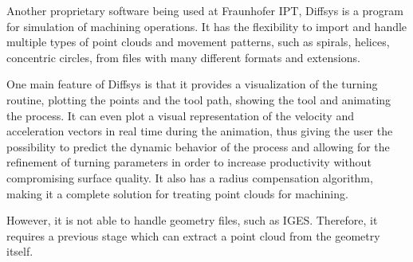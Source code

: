 	Another proprietary software being used at Fraunhofer IPT, Diffsys is a program for simulation of machining operations. It has the flexibility to import and handle multiple types of point clouds and movement patterns, such as spirals, helices, concentric circles, from files with many different formats and extensions.
	
	One main feature of Diffsys is that it provides a visualization of the turning routine, plotting the points and the tool path, showing the tool and animating the process. It can even plot a visual representation of the velocity and acceleration vectors in real time during the animation, thus giving the user the possibility to predict the dynamic behavior of the process and allowing for the refinement of turning parameters in order to increase productivity without compromising surface quality. It also has a radius compensation algorithm, making it a complete solution for treating point clouds for machining.
	
	However, it is not able to handle geometry files, such as IGES. Therefore, it requires a previous stage which can extract a point cloud from the geometry itself.
